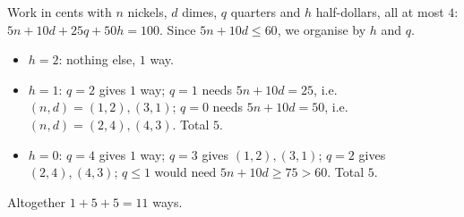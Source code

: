 Work in cents with $n$ nickels, $d$ dimes, $q$ quarters and $h$ half-dollars, all at most $4$: $5n+10d+25q+50h=100$. Since $5n+10d\le60$, we organise by $h$ and $q$.
\begin{itemize}
\item $h=2$: nothing else, $1$ way.
\item $h=1$: $q=2$ gives $1$ way; $q=1$ needs $5n+10d=25$, i.e. $(n,d)=(1,2),(3,1)$; $q=0$ needs $5n+10d=50$, i.e. $(n,d)=(2,4),(4,3)$. Total $5$.
\item $h=0$: $q=4$ gives $1$ way; $q=3$ gives $(1,2),(3,1)$; $q=2$ gives $(2,4),(4,3)$; $q\le1$ would need $5n+10d\ge75>60$. Total $5$.
\end{itemize}
Altogether $1+5+5=\boxed{11}$ ways.
